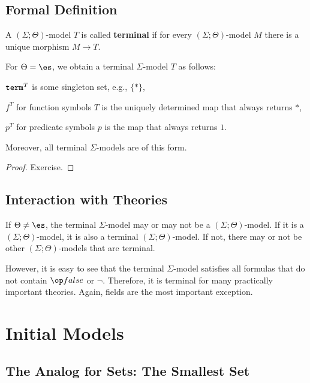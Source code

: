 \subsection{Formal Definition}

\begin{definition}
A $(\Sigma;\Theta)$-model $T$ is called \textbf{terminal} if for every $(\Sigma;\Theta)$-model $M$ there is a unique morphism $M\to T$.
\end{definition}

\begin{theorem}
For $\Theta=\es$, we obtain a terminal $\Sigma$-model $T$ as follows:
\begin{compactitem}
 \item $\mathtt{term}^T$ is some singleton set, e.g., $\{\ast\}$,
 \item $f^T$ for function symbols $T$ is the uniquely determined map that always returns $\ast$,
 \item $p^T$ for predicate symbols $p$ is the map that always returns $1$.
\end{compactitem}
Moreover, all terminal $\Sigma$-models are of this form.
\end{theorem}
\begin{proof}
Exercise.
\end{proof}

\subsection{Interaction with Theories}

If $\Theta\neq\es$, the terminal $\Sigma$-model may or may not be a $(\Sigma;\Theta)$-model.
If it is a $(\Sigma;\Theta)$-model, it is also a terminal $(\Sigma;\Theta)$-model.
If not, there may or not be other $(\Sigma;\Theta)$-models that are terminal.

However, it is easy to see that the terminal $\Sigma$-model satisfies all formulas that do not contain $\false$ or $\neg$.
Therefore, it is terminal for many practically important theories.
Again, fields are the most important exception.

\section{Initial Models}\label{sec:univ:init}

\subsection{The Analog for Sets: The Smallest Set}

